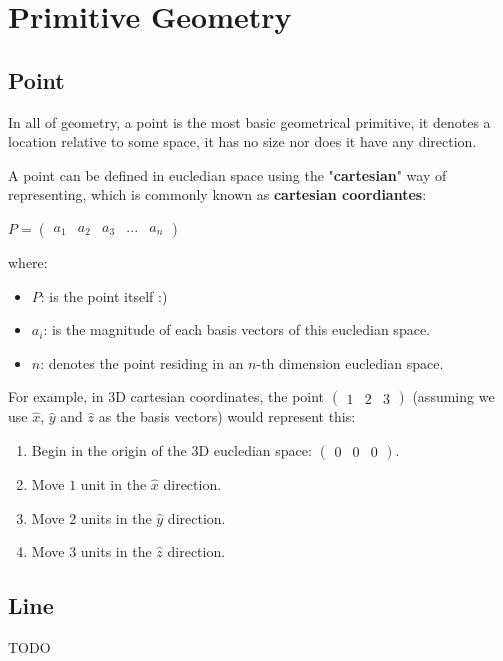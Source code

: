 \section{Primitive Geometry}
\subsection{Point}
In all of geometry, a point is the most basic geometrical primitive, it denotes a location relative to some space, it has no size
nor does it have any direction.

A point can be defined in eucledian space using the "\textbf{cartesian}" way of representing, which is commonly known as
\textbf{cartesian coordiantes}:
\begin{center}
    $P = \begin{pmatrix}a_1 & a_2 & a_3 & ... & a_n\end{pmatrix}$
\end{center}

where:
\begin{itemize}
    \item $P$: is the point itself :)
    \item $a_i$: is the magnitude of each basis vectors of this eucledian space.
    \item $n$: denotes the point residing in an $n$-th dimension eucledian space.
\end{itemize}

For example, in 3D cartesian coordinates, the point $\begin{pmatrix}1 & 2 & 3\end{pmatrix}$ 
(assuming we use $\hat{x}$, $\hat{y}$ and $\hat{z}$ as the basis vectors) would represent this:
\begin{enumerate}
    \item Begin in the origin of the 3D eucledian space: $\begin{pmatrix}0 & 0 & 0\end{pmatrix}$.
    \item Move $1$ unit in the $\hat{x}$ direction.
    \item Move $2$ units in the $\hat{y}$ direction.
    \item Move $3$ units in the $\hat{z}$ direction.
\end{enumerate}


\subsection{Line}
TODO

